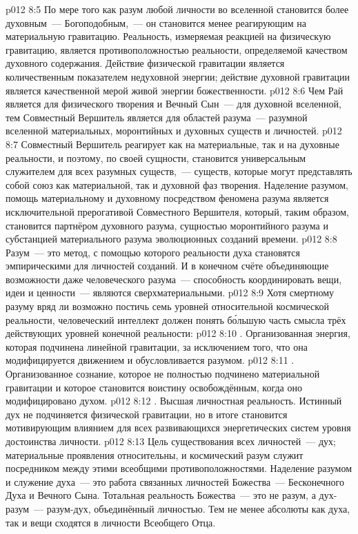 \vs p012 8:5 По мере того как разум любой личности во вселенной становится более духовным~--- Богоподобным,~--- он становится менее реагирующим на материальную гравитацию. Реальность, измеряемая реакцией на физическую гравитацию, является противоположностью реальности, определяемой качеством духовного содержания. Действие физической гравитации является количественным показателем недуховной энергии; действие духовной гравитации является качественной мерой живой энергии божественности.
\vs p012 8:6 \pc Чем Рай является для физического творения и Вечный Сын~--- для духовной вселенной, тем Совместный Вершитель является для областей разума~--- разумной вселенной материальных, моронтийных и духовных существ и личностей.
\vs p012 8:7 Совместный Вершитель реагирует как на материальные, так и на духовные реальности, и поэтому, по своей сущности, становится универсальным служителем для всех разумных существ,~--- существ, которые могут представлять собой союз как материальной, так и духовной фаз творения. Наделение разумом, помощь материальному и духовному посредством феномена разума является исключительной прерогативой Совместного Вершителя, который, таким образом, становится партнёром духовного разума, сущностью моронтийного разума и субстанцией материального разума эволюционных созданий времени.
\vs p012 8:8 Разум~--- это метод, с помощью которого реальности духа становятся эмпирическими для личностей созданий. И в конечном счёте объединяющие возможности даже человеческого разума~--- способность координировать вещи, идеи и ценности~--- являются сверхматериальными.
\vs p012 8:9 \pc Хотя смертному разуму вряд ли возможно постичь семь уровней относительной космической реальности, человеческий интеллект должен понять б\'ольшую часть смысла трёх действующих уровней конечной реальности:
\vs p012 8:10 . Организованная энергия, которая подчинена линейной гравитации, за исключением того, что она модифицируется движением и обусловливается разумом.
\vs p012 8:11 . Организованное сознание, которое не полностью подчинено материальной гравитации и которое становится воистину освобождённым, когда оно модифицировано духом.
\vs p012 8:12 . Высшая личностная реальность. Истинный дух не подчиняется физической гравитации, но в итоге становится мотивирующим влиянием для всех развивающихся энергетических систем уровня достоинства личности.
\vs p012 8:13 \pc Цель существования всех личностей~--- дух; материальные проявления относительны, и космический разум служит посредником между этими всеобщими противоположностями. Наделение разумом и служение духа~--- это работа связанных личностей Божества~--- Бесконечного Духа и Вечного Сына. Тотальная реальность Божества~--- это не разум, а дух\hyp{}разум~--- разум\hyp{}дух, объединённый личностью. Тем не менее абсолюты как духа, так и вещи сходятся в личности Всеобщего Отца.
